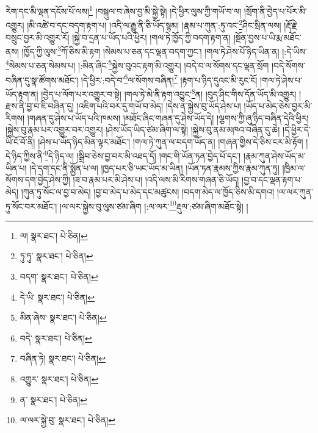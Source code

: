 རེག་དང་མི་ལྡན་དངོས་པོ་ལས།\footnote{ལ།  སྣར་ཐང་།  པེ་ཅིན། } །བསྐུལ་བ་ཞེས་བྱ་མི་སྐྱེ་སྟེ། །དེ་ཕྱིར་ལུས་ཀྱི་གཡོ་བ་ལ། །སྲོག་ནི་བྱེད་པ་པོར་མི་འགྱུར། །མི་འཚེ་བ་དང་བདག་རྟག་པ། །འདི་ལ་རྒྱུ་ནི་ཅི་ཡོད་སྙམ། །རྣམ་པ་ཀུན་:ཏུ་འང་\footnote{ཏུ་ཏུ་  སྣར་ཐང་།  པེ་ཅིན། }ཤིང་སྲིན་ལས། །རྡོ་རྗེ་བསྲུང་བྱར་མི་འགྱུར་རོ། །སྐྱེ་བ་དྲན་པ་ཡོད་པའི་ཕྱིར། །གལ་ཏེ་ཁྱོད་ཀྱི་བདག་རྟག་ན། །སྔོན་བྱས་པ་ཡི་རྨ་མཐོང་ནས། །ཁྱོད་ཀྱི་ལུས་\footnote{བདག་  སྣར་ཐང་།  པེ་ཅིན། }ཀོ་ཅིས་མི་རྟག །སེམས་པ་ཅན་དང་ལྡན་བདག་ཀྱང་། །གལ་ཏེ་ཤེས་པོ་ཉིད་ཡིན་ན། །:དེ་ཡིས་\footnote{དེ་ཡི་  སྣར་ཐང་།  པེ་ཅིན། }སེམས་པ་ཅན་སེམས་པ། །:མིན་ཞིང་\footnote{མིན་ཞེས་  སྣར་ཐང་།  པེ་ཅིན། }སྐྱེས་བུའང་རྟག་མི་འགྱུར། །བདེ་བ་ལ་སོགས་དང་ལྡན་སྲོག །བདེ་སོགས་བཞིན་དུ་སྣ་ཚོགས་མཐོང་། །དེ་ཕྱིར་:བདེ་བ་\footnote{བདེ་  སྣར་ཐང་།  པེ་ཅིན། }ལ་སོགས་བཞིན།\footnote{བཞིན་ཏེ།  སྣར་ཐང་།  པེ་ཅིན། } །རྟག་པ་ཉིད་དུའང་མི་རུང་ངོ། །གལ་ཏེ་ཤེས་པ་ཡོད་རྟག་ན། །བྱེད་པ་ལོག་པར་འགྱུར་བ་སྟེ། །གལ་ཏེ་མེ་ནི་རྟག་འབྱུང་\footnote{འགྱུར་  སྣར་ཐང་།  པེ་ཅིན། }ན། །བུད་ཤིང་གིས་དོན་ཡོད་མི་འགྱུར། །རྫས་ནི་བྱ་བ་ཇི་བཞིན་དུ། །འཇིག་པའི་བར་དུ་གཡོ་བ་མེད། །དེས་ན་སྐྱེས་བུ་ཡོད་ཤེས་པ། །ཡོད་པ་མེད་ཅེས་བྱར་མི་རིགས། །གཞན་དུ་ཤེས་པ་ཡོད་པའི་ཁམས། །མཐོང་ཞིང་གཞན་དུ་ཤེས་ཡོད་དེ། །ལྕགས་ཀྱི་ཞུ་ཉིད་བཞིན་དེའི་ཕྱིར། །སྐྱེས་བུ་རྣམ་པར་འགྱུར་བར་འགྱུར། །ཤེས་ཡོད་ཡིད་ཙམ་ཞིག་ལ་སྟེ། །སྐྱེས་བུ་ནམ་མཁའ་བཞིན་དུ་ཆེ། །དེ་ཕྱིར་དེ་ཡི་ངོ་བོ་ནི། །ཤེས་པ་ཡོད་ཉིད་མིན་ལྟར་མཐོང་། །གལ་ཏེ་ཀུན་ལ་བདག་ཡོད་ན། །གཞན་གྱིས་དེ་ཅིས་ངར་མི་རྟོག །དེ་ཉིད་ཀྱིས་ནི་\footnote{ན་  སྣར་ཐང་།  པེ་ཅིན། }དེ་ཉིད་ལ། །སྒྲིབ་ཅེས་བྱ་བར་མི་འཐད་དོ། །གང་གི་ཡོན་ཏན་བྱེད་པོ་དང་། །རྣམ་ཀུན་ཤེས་ཡོད་མ་ཡིན་པ། །དེ་དག་དང་ནི་སྨྱོན་པ་ལ། །ཁྱད་པར་ཅི་ཡང་ཡོད་མ་ཡིན། །ཡོན་ཏན་རྣམས་ཀྱིས་རྣམ་ཀུན་ཏུ། །ཁྱིམ་ལ་སོགས་དག་བྱེད་ཤེས་ཀྱི། །ཟ་བ་རྣམ་པར་མི་ཤེས་པ། །འདི་ལས་མི་རིགས་གཞན་ཅི་ཡོད། །བྱ་བ་དང་ལྡན་རྟག་པ་མེད། །ཀུན་ཏུ་སོང་ལ་བྱ་བ་མེད། །བྱ་བ་མེད་པ་མེད་དང་མཚུངས། །བདག་མེད་ལ་ཁྱོད་ཅིས་མི་དགའ། །ལ་ལར་ཀུན་ཏུ་སོང་བར་མཐོང་། །ལ་ལར་སྐྱེས་བུ་ལུས་ཙམ་ཞིག །:ལ་ལར་\footnote{ལ་ལར་སྐྱེ་བུ་  སྣར་ཐང་།  པེ་ཅིན། }རྡུལ་:ཙམ་ཞིག་མཐོང་སྟེ། །
